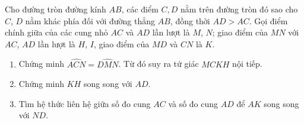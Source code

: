 \begin{ex}%
Cho đường tròn đường kính $AB$, các điểm $C,D$ nằm trên đường tròn đó sao cho $C$, $D$ nằm khác phía đối với đường thẳng $AB$, đồng thời $AD>AC$. Gọi điểm chính giữa của các cung nhỏ $AC$ và $AD$ lần lượt là $M$, $N$; giao điểm của $MN$ với $AC$, $ AD$ lần lượt là $H$, $I$, giao điểm của $MD$ và $CN$ là $K$.
\begin{enumerate}
\item Chứng minh $\widehat{ACN}=\widehat{DMN}$. Từ đó suy ra tứ giác $MCKH$ nội tiếp.
\item Chứng minh $KH$ song song với $AD$.
\item Tìm hệ thức liên hệ giữa số đo cung $AC$ và số đo cung $AD$ để $AK$ song song với $ND$.
\end{enumerate}
\end{ex}
